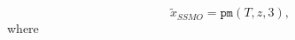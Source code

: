 \begin{equation*}
    \tilde{x}_{SSMO} = \texttt{pm}(T,z,3),
\end{equation*}
where
\begin{center}
            
        
        
        
        
        
        
            
            
            

\end{center}
